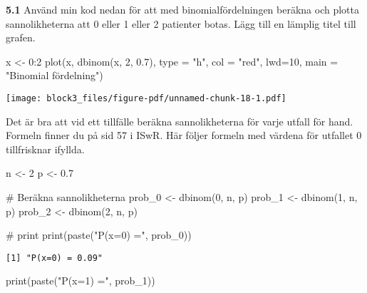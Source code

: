\documentclass[
  letterpaper,
  DIV=11,
  numbers=noendperiod]{scrartcl}
\newenvironment{Shaded}{\begin{snugshade}}{\end{snugshade}}
\newcommand{\AttributeTok}[1]{\textcolor[rgb]{0.40,0.45,0.13}{#1}}
\newcommand{\CommentTok}[1]{\textcolor[rgb]{0.37,0.37,0.37}{#1}}
\newcommand{\DecValTok}[1]{\textcolor[rgb]{0.68,0.00,0.00}{#1}}
\newcommand{\FloatTok}[1]{\textcolor[rgb]{0.68,0.00,0.00}{#1}}
\newcommand{\FunctionTok}[1]{\textcolor[rgb]{0.28,0.35,0.67}{#1}}
\newcommand{\NormalTok}[1]{\textcolor[rgb]{0.00,0.23,0.31}{#1}}
\newcommand{\OtherTok}[1]{\textcolor[rgb]{0.00,0.23,0.31}{#1}}
\newcommand{\SpecialCharTok}[1]{\textcolor[rgb]{0.37,0.37,0.37}{#1}}
\newcommand{\StringTok}[1]{\textcolor[rgb]{0.13,0.47,0.30}{#1}}
\begin{document}
\textbf{5.1} Använd min kod nedan för att med binomialfördelningen
beräkna och plotta sannolikheterna att 0 eller 1 eller 2 patienter
botas. Lägg till en lämplig titel till grafen.

\begin{Shaded}
\begin{Highlighting}[]
\NormalTok{x }\OtherTok{\textless{}{-}} \DecValTok{0}\SpecialCharTok{:}\DecValTok{2}
\FunctionTok{plot}\NormalTok{(x, }\FunctionTok{dbinom}\NormalTok{(x, }\DecValTok{2}\NormalTok{, }\FloatTok{0.7}\NormalTok{), }\AttributeTok{type =} \StringTok{"h"}\NormalTok{, }\AttributeTok{col =} \StringTok{"red"}\NormalTok{, }\AttributeTok{lwd=}\DecValTok{10}\NormalTok{, }\AttributeTok{main =} \StringTok{"Binomial fördelning"}\NormalTok{)}
\end{Highlighting}
\end{Shaded}

\texttt{[image: block3\_files/figure-pdf/unnamed-chunk-18-1.pdf]}

Det är bra att vid ett tillfälle beräkna sannolikheterna för varje
utfall för hand. Formeln finner du på sid 57 i ISwR. Här följer formeln
med värdena för utfallet 0 tillfrisknar ifyllda.

\begin{Shaded}
\begin{Highlighting}[]
\NormalTok{n }\OtherTok{\textless{}{-}} \DecValTok{2}
\NormalTok{p }\OtherTok{\textless{}{-}} \FloatTok{0.7}

\CommentTok{\# Beräkna sannolikheterna}
\NormalTok{prob\_0 }\OtherTok{\textless{}{-}} \FunctionTok{dbinom}\NormalTok{(}\DecValTok{0}\NormalTok{, n, p)}
\NormalTok{prob\_1 }\OtherTok{\textless{}{-}} \FunctionTok{dbinom}\NormalTok{(}\DecValTok{1}\NormalTok{, n, p)}
\NormalTok{prob\_2 }\OtherTok{\textless{}{-}} \FunctionTok{dbinom}\NormalTok{(}\DecValTok{2}\NormalTok{, n, p)}

\CommentTok{\# print}
\FunctionTok{print}\NormalTok{(}\FunctionTok{paste}\NormalTok{(}\StringTok{"P(x=0) ="}\NormalTok{, prob\_0))}
\end{Highlighting}
\end{Shaded}

\begin{verbatim}
[1] "P(x=0) = 0.09"
\end{verbatim}

\begin{Shaded}
\begin{Highlighting}[]
\FunctionTok{print}\NormalTok{(}\FunctionTok{paste}\NormalTok{(}\StringTok{"P(x=1) ="}\NormalTok{, prob\_1))}
\end{Highlighting}
\end{Shaded}
\end{document}

